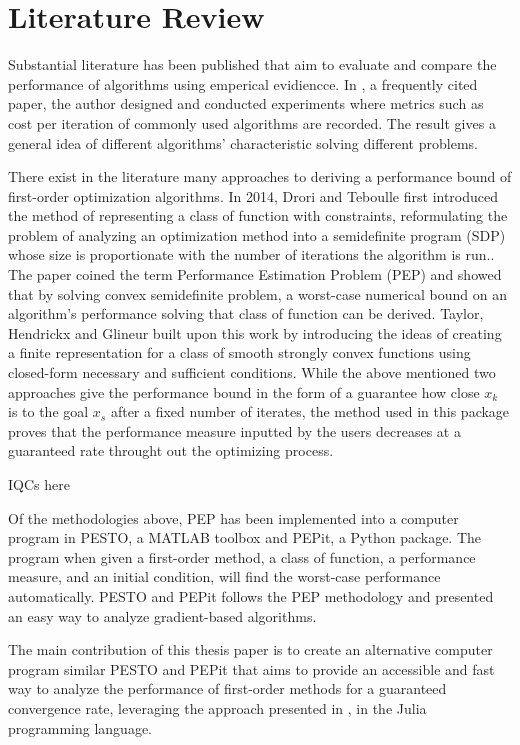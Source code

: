  \chapter{Literature Review}

Substantial literature has been published that aim to evaluate and compare the performance of algorithms using emperical evidiencce. In \cite{adam}, a frequently cited paper, the author designed and conducted experiments where metrics such as cost per iteration of commonly used algorithms are recorded. The result gives a general idea of different algorithms' characteristic solving different problems.

There exist in the literature many approaches to deriving a performance bound of first-order optimization algorithms. In 2014, Drori and Teboulle first introduced the method of representing a class of function with constraints, reformulating the problem of analyzing an optimization method into a semidefinite program (SDP) whose size is proportionate with the number of iterations the algorithm is run.\cite{drori2012}. The paper coined the term Performance Estimation Problem (PEP) and showed that by solving convex semidefinite problem, a worst-case numerical bound on an algorithm's performance solving that class of function can be derived. Taylor, Hendrickx and Glineur built upon this work by introducing the ideas of creating a finite representation for a class of smooth strongly convex functions using closed-form necessary and sufficient conditions. While the above mentioned two approaches give the performance bound in the form of a guarantee how close \(x_k\) is to the goal \(x_s\) after a fixed number of iterates, the method used in this package proves that the performance measure inputted by the users decreases at a guaranteed rate throught out the optimizing process.

IQCs here

Of the methodologies above, PEP has been implemented into a computer program in PESTO, a MATLAB toolbox and PEPit, a Python package. The program when given a first-order method, a class of function, a performance measure, and an initial condition, will find the worst-case performance automatically. PESTO and PEPit follows the PEP methodology and presented an easy way to analyze gradient-based algorithms.

The main contribution of this thesis paper is to create an alternative computer program similar PESTO and PEPit that aims to provide an accessible and fast way to analyze the performance of first-order methods for a guaranteed convergence rate, leveraging the approach presented in \cite{tutorial}, in the Julia programming language.